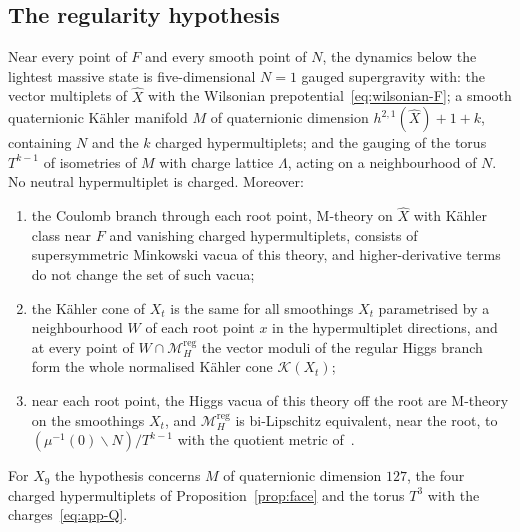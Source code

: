 \subsection{The regularity hypothesis}
\label{subsec:hypotheses}

\begin{hypothesis}[regularity]\label{hyp:regular}
Near every point of $F$ and every smooth point of $N$, the dynamics below the lightest massive
state is five-dimensional $N=1$ gauged supergravity with: the vector multiplets of $\widehat X$
with the Wilsonian prepotential~\eqref{eq:wilsonian-F}; a smooth quaternionic K\"ahler manifold
$M$ of quaternionic dimension $h^{2,1}(\widehat X)+1+k$, containing $N$ and the $k$ charged
hypermultiplets; and the gauging of the torus $T^{k-1}$ of isometries of $M$ with charge
lattice $\Lambda$, acting on a neighbourhood of $N$. No neutral hypermultiplet is charged.
Moreover:
\begin{enumerate}
\item the Coulomb branch through each root point, M-theory on $\widehat X$ with K\"ahler class
 near $F$ and vanishing charged hypermultiplets, consists of supersymmetric Minkowski vacua of
 this theory, and higher-derivative terms do not change the set of such vacua;
\item the K\"ahler cone of $X_t$ is the same for all smoothings $X_t$ parametrised by a
 neighbourhood $W$ of each root point $x$ in the hypermultiplet directions, and at every point of
 $W\cap\mathcal M_H^{\mathrm{reg}}$ the vector moduli of the regular Higgs branch form the whole
 normalised K\"ahler cone $\mathcal K(X_t)$;
\item near each root point, the Higgs vacua of this theory off the root are M-theory on the
 smoothings $X_t$, and $\mathcal M_H^{\mathrm{reg}}$ is bi-Lipschitz equivalent, near the root,
 to $(\mu^{-1}(0)\smallsetminus N)/T^{k-1}$ with the quotient metric of~\cite{Galicki:1988}.
\end{enumerate}
\end{hypothesis}

For $X_9$ the hypothesis concerns $M$ of quaternionic dimension $127$, the four charged
hypermultiplets of Proposition~\ref{prop:face} and the torus $T^3$ with the
charges~\eqref{eq:app-Q}.

